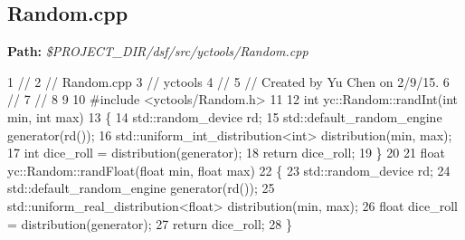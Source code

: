  \hypertarget{yctools_yctoolsRandom_cpp}{}\subsection{Random.\+cpp}\label{yctools_yctoolsRandom_cpp}
{\bfseries Path\+:} {\itshape \$\+P\+R\+O\+J\+E\+C\+T\+\_\+\+D\+I\+R/dsf/src/yctools/\+Random.cpp} 
\begin{DoxyCodeInclude}
1 \textcolor{comment}{//}
2 \textcolor{comment}{//  Random.cpp}
3 \textcolor{comment}{//  yctools}
4 \textcolor{comment}{//}
5 \textcolor{comment}{//  Created by Yu Chen on 2/9/15.}
6 \textcolor{comment}{//}
7 \textcolor{comment}{//}
8 
9 
10 \textcolor{preprocessor}{#include <yctools/Random.h>}
11 
12 \textcolor{keywordtype}{int} yc::Random::randInt(\textcolor{keywordtype}{int} min, \textcolor{keywordtype}{int} max)
13 \{
14     std::random\_device rd;
15     std::default\_random\_engine generator(rd());
16     std::uniform\_int\_distribution<int> distribution(min, max);
17     \textcolor{keywordtype}{int} dice\_roll = distribution(generator);
18     \textcolor{keywordflow}{return} dice\_roll;
19 \}
20 
21 \textcolor{keywordtype}{float} yc::Random::randFloat(\textcolor{keywordtype}{float} min, \textcolor{keywordtype}{float} max)
22 \{
23     std::random\_device rd;
24     std::default\_random\_engine generator(rd());
25     std::uniform\_real\_distribution<float> distribution(min, max);
26     \textcolor{keywordtype}{float} dice\_roll = distribution(generator);
27     \textcolor{keywordflow}{return} dice\_roll;
28 \}
\end{DoxyCodeInclude}
 